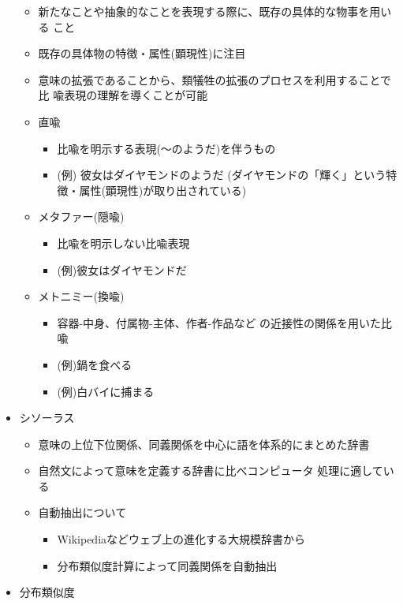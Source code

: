 \documentclass[a4j,11pt]{jsarticle}
\begin{document}
\begin{itemize}
       \begin{itemize}
	\item 新たなことや抽象的なことを表現する際に、既存の具体的な物事を用いる
	      こと
	\item 既存の具体物の特徴・属性(顕現性)に注目
	\item 意味の拡張であることから、類犠牲の拡張のプロセスを利用することで比
	      喩表現の理解を導くことが可能
	\item 直喩
	      \begin{itemize}
	       \item 比喩を明示する表現(〜のようだ)を伴うもの
	       \item (例) 彼女はダイヤモンドのようだ
		     (ダイヤモンドの「輝く」という特徴・属性(顕現性)が取り出されている)
	      \end{itemize}
	\item メタファー(隠喩)
	      \begin{itemize}
	       \item 比喩を明示しない比喩表現
	       \item (例)彼女はダイヤモンドだ
	      \end{itemize}
	\item メトニミー(換喩)
	      \begin{itemize}
	       \item 容器-中身、付属物-主体、作者-作品など
		     の近接性の関係を用いた比喩
	       \item (例)鍋を食べる
	       \item (例)白バイに捕まる
	      \end{itemize}
       \end{itemize}
 \item シソーラス
       \begin{itemize}
	\item 意味の上位下位関係、同義関係を中心に語を体系的にまとめた辞書
	\item 自然文によって意味を定義する辞書に比べコンピュータ
	      処理に適している
	\item 自動抽出について
	      \begin{itemize}
	       \item Wikipediaなどウェブ上の進化する大規模辞書から
	       \item 分布類似度計算によって同義関係を自動抽出
	      \end{itemize}
       \end{itemize}
 \item 分布類似度
       \begin{itemize}

\end{itemize}
\end{itemize}
\end{document}
